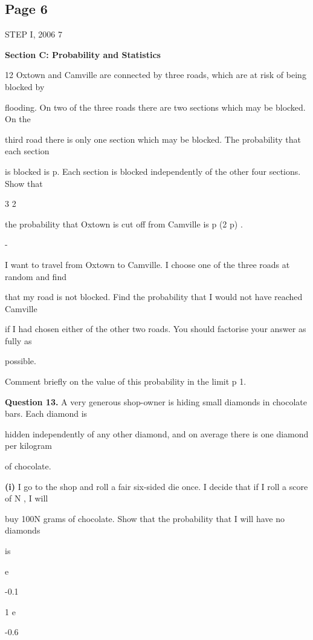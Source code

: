 \documentclass[12pt]{article}
\begin{document}
\subsection*{Page 6}
\begin{flushleft}
STEP I, 2006 7\par
\bigskip\textbf{Section C: Probability and Statistics}\par
12 Oxtown and Camville are connected by three roads, which are at risk of being blocked by\par
flooding. On two of the three roads there are two sections which may be blocked. On the\par
third road there is only one section which may be blocked. The probability that each section\par
is blocked is p. Each section is blocked independently of the other four sections. Show that\par
3 2\par
the probability that Oxtown is cut off from Camville is p (2 p) .\par
-\par
I want to travel from Oxtown to Camville. I choose one of the three roads at random and find\par
that my road is not blocked. Find the probability that I would not have reached Camville\par
if I had chosen either of the other two roads. You should factorise your answer as fully as\par
possible.\par
Comment briefly on the value of this probability in the limit p 1.\par
\to\par
\bigskip\textbf{Question 13.} A very generous shop-owner is hiding small diamonds in chocolate bars. Each diamond is\par
hidden independently of any other diamond, and on average there is one diamond per kilogram\par
of chocolate.\par
\textbf{(i)} I go to the shop and roll a fair six-sided die once. I decide that if I roll a score of N , I will\par
buy 100N grams of chocolate. Show that the probability that I will have no diamonds\par
is\par
e\par
-0.1\par
1 e\par
-0.6\par

\end{flushleft}
\end{document}
